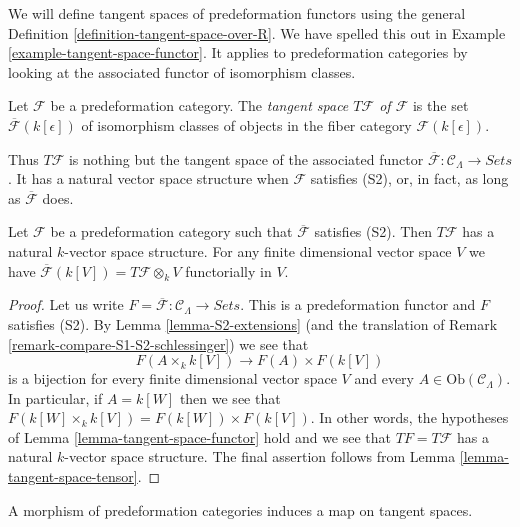 \noindent
We will define tangent spaces of predeformation functors using the general
Definition \ref{definition-tangent-space-over-R}.
We have spelled this out in
Example \ref{example-tangent-space-functor}.
It applies to predeformation categories by looking at the associated
functor of isomorphism classes.

\begin{definition}
\label{definition-tangent-space}
Let $\mathcal{F}$ be a predeformation category.
The {\it tangent space $T \mathcal{F}$ of $\mathcal{F}$}
is the set $\overline{\mathcal{F}}(k[\epsilon])$ 
of isomorphism classes of objects in the fiber category $\mathcal 
F(k[\epsilon])$.
\end{definition}

\noindent
Thus $T \mathcal{F}$ is nothing but the tangent space of the associated
functor $\overline{\mathcal{F}}: \mathcal{C}_\Lambda \to \textit{Sets}$. 
It has a natural vector space structure when $\mathcal{F}$ satisfies (S2),
or, in fact, as long as $\overline{\mathcal{F}}$ does.

\begin{lemma}
\label{lemma-tangent-space-vector-space}
Let $\mathcal{F}$ be a predeformation category such that
$\overline{\mathcal{F}}$ satisfies (S2). Then $T \mathcal{F}$ has a
natural $k$-vector space structure. For any finite dimensional
vector space $V$ we have
$\overline{\mathcal{F}}(k[V]) = T\mathcal{F} \otimes_k V$
functorially in $V$.
\end{lemma}

\begin{proof}
Let us write
$F = \overline{\mathcal{F}} : \mathcal{C}_\Lambda \to \textit{Sets}$.
This is a predeformation functor and $F$ satisfies (S2). By
Lemma \ref{lemma-S2-extensions}
(and the translation of
Remark \ref{remark-compare-S1-S2-schlessinger})
we see that
$$
F(A \times_k k[V]) \longrightarrow F(A) \times F(k[V])
$$
is a bijection for every finite dimensional vector space $V$ and every
$A \in \text{Ob}(\mathcal{C}_\Lambda)$. In particular, if $A = k[W]$
then we see that $F(k[W] \times_k k[V]) = F(k[W]) \times F(k[V])$.
In other words, the hypotheses of
Lemma \ref{lemma-tangent-space-functor}
hold and we see that $TF = T \mathcal{F}$
has a natural $k$-vector space structure.
The final assertion follows from
Lemma \ref{lemma-tangent-space-tensor}.
\end{proof}

\noindent
A morphism of predeformation categories induces a map on tangent spaces.

